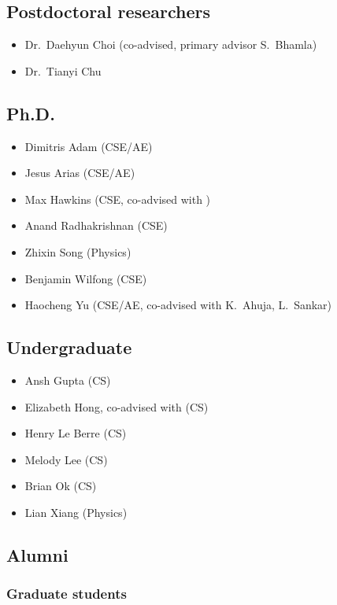 \subsection{Postdoctoral researchers}

\begin{itemize}
    \item Dr.\ Daehyun Choi (co-advised, primary advisor S.\ Bhamla)
    \item Dr.\ Tianyi Chu
\end{itemize}

\subsection{Ph.D.}

\begin{itemize}
    \item Dimitris Adam (CSE/AE)
    \item Jesus Arias (CSE/AE)
    \item Max Hawkins (CSE, co-advised with \Rich)
    \item Anand Radhakrishnan (CSE)
    \item Zhixin Song (Physics)
    \item Benjamin Wilfong (CSE)
    \item Haocheng Yu (CSE/AE, co-advised with K.\ Ahuja, L.\ Sankar)
\end{itemize}

\subsection{Undergraduate}

\begin{itemize}
    \item Ansh Gupta (CS)
    \item Elizabeth Hong, co-advised with \Rich (CS)
    \item Henry Le Berre (CS)
    \item Melody Lee (CS)
    \item Brian Ok (CS)
    \item Lian Xiang (Physics)
\end{itemize}

\subsection{Alumni}

\subsubsection{Graduate students}

